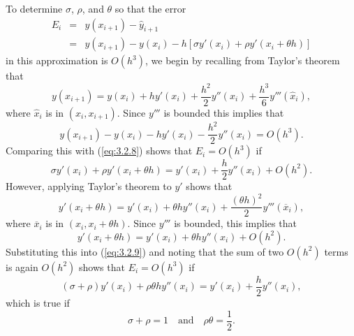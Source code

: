 \documentclass{ximera}
\begin{document}
To determine $\sigma$, $\rho$, and $\theta$ so that the error
\begin{equation} \label{eq:3.2.8}
\begin{array}{rcl}
E_i&=&y(x_{i+1})-\hat y_{i+1}\\
&=&y(x_{i+1})-y(x_i)-h\left[\sigma y'(x_i)+\rho y'(x_i+\theta
h)\right]
\end{array}
\end{equation}
in this approximation is $O(h^3)$, we begin by recalling from Taylor's
theorem that
$$
y(x_{i+1})=y(x_i)+hy'(x_i)+\frac{h^2}{2}y''(x_i)+\frac{h^3}{6}y'''(\hat
x_i),
$$
where $\hat x_i$ is in $(x_i,x_{i+1})$. Since $y'''$ is bounded this
implies that
$$
 y(x_{i+1})-y(x_i)-hy'(x_i)-\frac{h^2}{2}y''(x_i)=O(h^3).
$$
Comparing this with (\ref{eq:3.2.8}) shows that $E_i=O(h^3)$ if
\begin{equation} \label{eq:3.2.9}
\sigma y'(x_i)+\rho y'(x_i+\theta h)=y'(x_i)+\frac{h}{2}y''(x_i)
+O(h^2).
\end{equation}
However, applying Taylor's theorem to $y'$ shows that
$$
y'(x_i+\theta h)=y'(x_i)+\theta h y''(x_i)+\frac{(\theta
h)^2}{2}y'''(\overline x_i),
$$
where $\overline x_i$ is in $(x_i,x_i+\theta h)$. Since $y'''$ is
bounded, this implies that
$$
y'(x_i+\theta h)=y'(x_i)+\theta h y''(x_i)+O(h^2).
$$
Substituting this into (\ref{eq:3.2.9}) and noting that the sum of
two $O(h^2)$ terms is again $O(h^2)$ shows that
$E_i=O(h^3)$ if
$$
(\sigma+\rho)y'(x_i)+\rho\theta h y''(x_i)=
y'(x_i)+\frac{h}{2}y''(x_i),
$$
which is true if
\begin{equation} \label{eq:3.2.10}
\sigma+\rho=1 \quad\mbox{and}\quad \rho\theta=\frac{1}{2}.
\end{equation}
\end{document}
